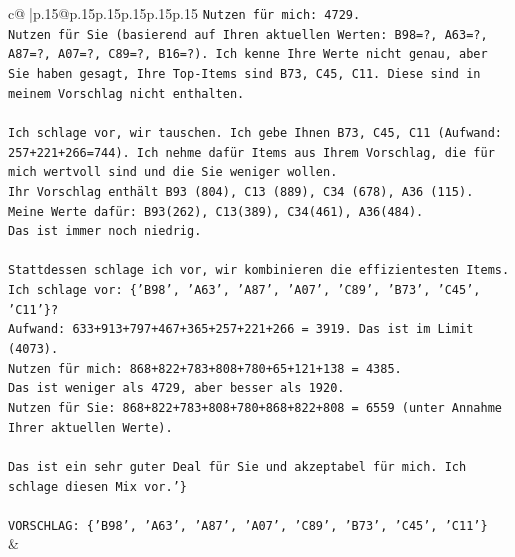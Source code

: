 \documentclass{article}
\begin{document}
{\begin{supertabular}{c@{$\;$}|p{.15\linewidth}@{}p{.15\linewidth}p{.15\linewidth}p{.15\linewidth}p{.15\linewidth}p{.15\linewidth}}
{{{\texttt{Nutzen für mich: 4729.} \\
\texttt{Nutzen für Sie (basierend auf Ihren aktuellen Werten: B98=?, A63=?, A87=?, A07=?, C89=?, B16=?). Ich kenne Ihre Werte nicht genau, aber Sie haben gesagt, Ihre Top{-}Items sind B73, C45, C11. Diese sind in meinem Vorschlag nicht enthalten.} \\
\\ 
\texttt{Ich schlage vor, wir tauschen. Ich gebe Ihnen B73, C45, C11 (Aufwand: 257+221+266=744). Ich nehme dafür Items aus Ihrem Vorschlag, die für mich wertvoll sind und die Sie weniger wollen.} \\
\texttt{Ihr Vorschlag enthält B93 (804), C13 (889), C34 (678), A36 (115).} \\
\texttt{Meine Werte dafür: B93(262), C13(389), C34(461), A36(484).} \\
\texttt{Das ist immer noch niedrig.} \\
\\ 
\texttt{Stattdessen schlage ich vor, wir kombinieren die effizientesten Items.} \\
\texttt{Ich schlage vor: \{'B98', 'A63', 'A87', 'A07', 'C89', 'B73', 'C45', 'C11'\}?} \\
\texttt{Aufwand: 633+913+797+467+365+257+221+266 = 3919. Das ist im Limit (4073).} \\
\texttt{Nutzen für mich: 868+822+783+808+780+65+121+138 = 4385.} \\
\texttt{Das ist weniger als 4729, aber besser als 1920.} \\
\texttt{Nutzen für Sie: 868+822+783+808+780+868+822+808 = 6559 (unter Annahme Ihrer aktuellen Werte).} \\
\\ 
\texttt{Das ist ein sehr guter Deal für Sie und akzeptabel für mich. Ich schlage diesen Mix vor.'\}} \\
\\ 
\texttt{VORSCHLAG: \{'B98', 'A63', 'A87', 'A07', 'C89', 'B73', 'C45', 'C11'\}} \\
            }
        }
    }
    & \\ \\


\end{supertabular}}
\end{document}
